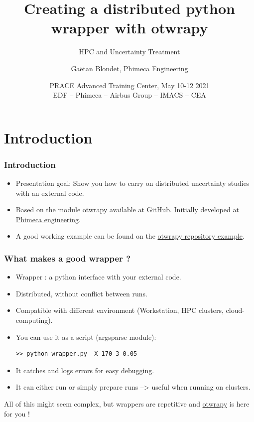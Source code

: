\documentclass[10pt, aspectratio=169]{beamer}
\title{Creating a distributed python wrapper with otwrapy}
\subtitle{HPC and Uncertainty Treatment}
\author[G. Blondet]{Gaëtan Blondet, Phimeca Engineering}
\date[OtWraPy - May 10-12 2021]{PRACE Advanced Training Center, May 10-12 2021\\EDF – Phimeca – Airbus Group – IMACS – CEA}
\begin{document}
\begin{frame}[plain]
  \titlepage
\end{frame}

\begin{frame}{\tableofcontentstitle}
  \tableofcontents[hideallsubsections]
\end{frame}

\label{sec-1}
\section{Introduction}

\begin{frame}
\frametitle{Introduction}
\begin{itemize}
	\item Presentation goal: Show you how to carry on distributed uncertainty studies with an external code.
	\item Based on the module \href{http://openturns.github.io/otwrapy/master/index.html}{otwrapy} available at \href{https://github.com/openturns/otwrapy}{GitHub}. Initially developed at \href{http://www.phimeca.com}{Phimeca engineering}.
	\item A good working example can be found on the  \href{https://github.com/openturns/otwrapy/tree/master/otwrapy/examples/beam}{otwrapy repository example}.
\end{itemize}
\end{frame}


\begin{frame}[fragile]
\frametitle{What makes a good wrapper ?}


\begin{itemize}
\item Wrapper : a python interface with your external code.
\item Distributed, without conflict between runs.
\item Compatible with different environment (Workstation, HPC clusters, cloud-computing).
\item You can use it as a script (argsparse module):

\begin{Verbatim}[xleftmargin=10mm]
   >> python wrapper.py -X 170 3 0.05
\end{Verbatim}


\item It catches and logs errors for easy debugging.
\item It can either run or simply prepare runs --> useful when running on
  clusters.
\end{itemize}
All of this  might seem complex, but wrappers are repetitive and
\href{https://github.com/openturns/otwrapy}{otwrapy} is here for you !
\end{frame}
\end{document}
